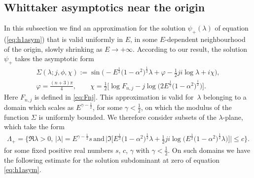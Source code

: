 \documentclass[pdftex]{sigma}
\numberwithin{equation}{section}
\newcommand{\la}{\lambda}
\newcommand{\al}{\alpha}
\begin{document}
\subsection{Whittaker asymptotics near the origin}\label{sub:whittaker}
In this subsection we f\/ind an approximation for the solution $\psi_+(\la)$ of equation (\ref{eq:h1asym}) that is valid uniformly in $E$, in some $E$-dependent neighbourhood of the origin, slowly shrinking as $E \to +\infty$. According to our result, the solution $\psi_+$ takes the asymptotic form
\begin{subequations}\label{eq:trig}
	\begin{gather}
	 \Sigma(\la;j,\phi,\chi):=\sin\big({-} E^{\frac12}\big(1-\al^2\big)^{\frac12}\la + \varphi -\tfrac{1}{2}ji \log \la +i \chi \big) ,\\
	 \varphi= \frac{(n+3)\pi}{4} ,\qquad \chi=\tfrac12 \big[\log F_{n,j} -j \log\big(2 E^{\frac12}\big(1-\al^2\big)^\frac12\big)\big].
	\end{gather}
\end{subequations}
Here $F_{n,j}$ is def\/ined in \eqref{eq:Fnj}. This approximation is valid for~$\la$ belonging to a domain which scales as $E^{\gamma-\frac12}$, for some $\gamma<\frac12$, on which the modulus of the function $\Sigma$ is uniformly bounded. We therefore consider subsets of the $\la$-plane, which take the form
\begin{gather}\label{eq:Lambdag}
\Lambda_{+}=\big\lbrace \Re \la>0 , \, |\la|= E^{\gamma-\frac12} s \,\mbox{and}\, \big|\Im\big[E^{\frac12}\big(1-\al^2\big)^{\frac12} \la +
\tfrac{1}{2}ji \log{\big( E^{\frac12}\big(1-\al^2\big)^{\frac12}\la\big)} \big]\big|\leq c \big\rbrace .\!\!\!
\end{gather}
for some f\/ixed positive real numbers $s$, $c$, $\gamma$ with $\gamma<\frac12$. On such domains we have the following estimate for the solution subdominant at zero of equation \eqref{eq:h1asym}.
\end{document}
